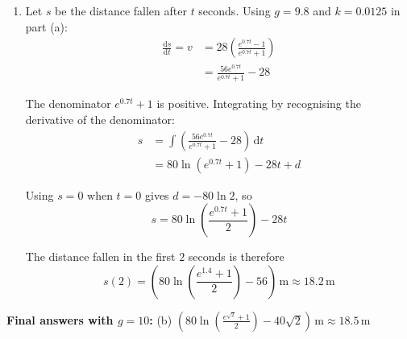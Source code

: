 \documentclass[leqno]{article}
\begin{document}
\begin{enumerate}[
  label=\textbf{\arabic*.},
  leftmargin=*,
  topsep=0pt,
  partopsep=0pt,
  parsep=0pt
]
\begin{djsSolution}
\begin{enumerate}[label=\textbf{(\alph*)}, start=1]
Let \(V=\sqrt{g/k}\) be the terminal speed. The package accelerates from rest towards this speed, so \(0\leq v<V\), and \(V+v\) and \(V-v\) are both positive.

Separating the variables and using partial fractions:
\begin{align*}
\int\frac{1}{V^2-v^2}\,\mathrm{d}v&=\int k\,\mathrm{d}t\\
\frac{1}{2V}\int\left(\frac{1}{V+v}+\frac{1}{V-v}\right)\,\mathrm{d}v&=\int k\,\mathrm{d}t\\
\frac{1}{2V}\ln\left(\frac{V+v}{V-v}\right)&=kt+c
\end{align*}

At release, \(t=0\) and \(v=0\), giving \(c=0\). Hence
\begin{align*}
\ln\left(\frac{V+v}{V-v}\right)&=2kVt\\
V+v&=e^{2kVt}(V-v)\\
v\left(1+e^{2kVt}\right)&=V\left(e^{2kVt}-1\right)\\
v&=\sqrt{\frac{g}{k}}\left(\frac{e^{2\sqrt{gk}\,t}-1}{e^{2\sqrt{gk}\,t}+1}\right)
\end{align*}

\item Let \(s\) be the distance fallen after \(t\) seconds. Using \(g=9.8\) and \(k=0.0125\) in part (a):
\begin{align*}
\frac{\mathrm{d}s}{\mathrm{d}t}=v
&=28\left(\frac{e^{0.7t}-1}{e^{0.7t}+1}\right)\\
&=\frac{56e^{0.7t}}{e^{0.7t}+1}-28
\end{align*}

The denominator \(e^{0.7t}+1\) is positive. Integrating by recognising the derivative of the denominator:
\begin{align*}
s&=\int\left(\frac{56e^{0.7t}}{e^{0.7t}+1}-28\right)\,\mathrm{d}t\\
&=80\ln\left(e^{0.7t}+1\right)-28t+d
\end{align*}

Using \(s=0\) when \(t=0\) gives \(d=-80\ln 2\), so
\[
s=80\ln\left(\frac{e^{0.7t}+1}{2}\right)-28t
\]

The distance fallen in the first \(2\) seconds is therefore
\[
s(2)=\left(80\ln\left(\frac{e^{1.4}+1}{2}\right)-56\right)\,\mathrm{m}
\approx18.2\,\mathrm{m}
\]
\end{enumerate}
\par\medskip\noindent\textbf{Final answers with \(g = 10\):} (b) \(\left(80\ln\left(\frac{e^{\sqrt{2}}+1}{2}\right)-40\sqrt{2}\right)\,\mathrm{m}\approx18.5\,\mathrm{m}\)
\end{djsSolution}


\end{enumerate}
\end{document}

